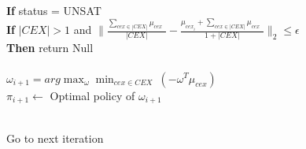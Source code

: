\begin{algorithm}[htb]
\begin{algorithmic}[1]
\\\qquad\qquad \textbf{If} status = UNSAT
\\\qquad\qquad\qquad \textbf{If} $|CEX|>1$ and $\|\frac{\underset{cex \in |CEX|}{\sum}\mu_{cex}\ \ }{|CEX|}-\frac{\mu_{cex_i} + \underset{cex \in |CEX|}{\sum}\mu_{cex}\ \ }{1 + |CEX|}\|_2\leq\epsilon$
\\\qquad\qquad\qquad\qquad  \textbf{Then} return Null\\
\\\qquad\qquad $\omega_{i+1} = arg\max_{\omega} \min_{cex\in CEX}\ (-\omega^T\mu_{cex})$
\\\qquad\qquad $\pi_{i+1}\gets$ Optimal policy of $\omega_{i+1}$

\\\qquad Go to next iteration

\end{algorithmic}
\end{algorithm}


